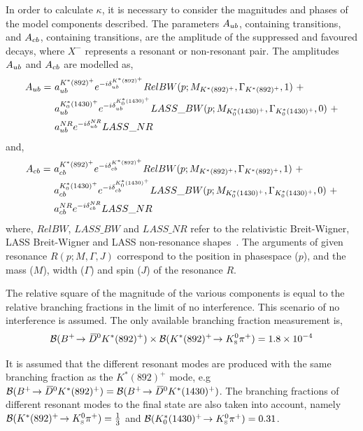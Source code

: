 In order to calculate $\kappa$, it is necessary to consider the magnitudes and phases of the model components described. The parameters $A_{{u}{b}}$, containing \decay{\bquark}{\uquark} transitions, and $A_{{c}{b}}$, containing \decay{\bquark}{\cquark} transitions, are the amplitude of the suppressed and favoured  decays, where $X^-$ represents a resonant or non-resonant \KS\pim pair. The amplitudes $A_{{u}{b}}$ and $A_{{c}{b}}$ are modelled as,
\begin{align*}
A_{\uquark\bquark} =\ & a_{\uquark\bquark}^{K^*(892)^+}e^{-i\delta_{\uquark\bquark}^{K^*(892)^+}}RelBW(p;M_{K^*(892)^+},\Gamma_{K^*(892)^+},1)\ + \\
& a_{\uquark\bquark}^{K^*_0(1430)^+}e^{-i\delta_{\uquark\bquark}^{K^*_0(1430)^+}}LASS\_BW(p;M_{K^*_0(1430)^+},\Gamma_{K^*_0(1430)^+},0)\ + \\
& a_{\uquark\bquark}^{NR}e^{-i\delta_{\uquark\bquark}^{NR}}LASS\_NR
\end{align*}
and,
\begin{align*}
A_{\cquark\bquark} =\ & a_{\cquark\bquark}^{K^*(892)^+}e^{-i\delta_{\cquark\bquark}^{K^*(892)^+}}RelBW(p;M_{K^*(892)^+},\Gamma_{K^*(892)^+},1)\ + \\
& a_{\cquark\bquark}^{K^*_0(1430)^+}e^{-i\delta_{\cquark\bquark}^{K^*_0(1430)^+}}LASS\_BW(p;M_{K^*_0(1430)^+},\Gamma_{K^*_0(1430)^+},0)\ + \\
& a_{\cquark\bquark}^{NR}e^{-i\delta_{\cquark\bquark}^{NR}}LASS\_NR
\end{align*}
where, $RelBW$, $LASS\_BW$ and $LASS\_NR$ refer to the relativistic Breit-Wigner, LASS Breit-Wigner and LASS non-resonance shapes~\cite{LASS}. The arguments of given resonance $R(p;M,\Gamma,J)$ correspond to the position in \decay{\Bm}{\D\KS\pim} phasespace ($p$), and the mass ($M$), width ($\Gamma$) and spin ($J$) of the resonance $R$.%

The relative square of the magnitude of the various components is equal to the relative branching fractions in the limit of no interference. This scenario of no interference is assumed. The only available branching fraction measurement is,
\begin{equation*}
{\ensuremath{\mathcal{B}}}({{{B}^+}}\!\rightarrow {\ensuremath{{\kern 0.2em\overline{\kern -0.2em D}{}}{}^0}} K^*(892)^+) \times {\ensuremath{\mathcal{B}}}(K^*(892)^+\!\rightarrow {\ensuremath{{K}^0_{\mathrm{ \scriptscriptstyle S}}}}{\ensuremath{{\pi}^+}}) = 1.8 \times 10^{-4}
\end{equation*}

It is assumed that the different resonant \Kstarp modes are produced with the same branching fraction as the $K^*(892)^+$ mode, e.g ${\mathcal{B}}({{{B}^+}}\!\rightarrow {\ensuremath{{\kern 0.2em\overline{\kern -0.2em D}{}}{}^0}} K^*(892)^+) = {\mathcal{B}}({{{B}^+}}\!\rightarrow {\ensuremath{{\kern 0.2em\overline{\kern -0.2em D}{}}{}^0}} K^*(1430)^+)$. The branching fractions of different resonant \Kstarp modes to the \KS\pip final state are also taken into account, namely ${\mathcal{B}}(K^*(892)^+\!\rightarrow {\ensuremath{{K}^0_{\mathrm{ \scriptscriptstyle S}}}}{\ensuremath{{\pi}^+}}) = \frac{1}{3}$ and ${\mathcal{B}}(K^*_0(1430)^+\!\rightarrow {\ensuremath{{K}^0_{\mathrm{ \scriptscriptstyle S}}}}{\ensuremath{{\pi}^+}}) = 0.31$.

